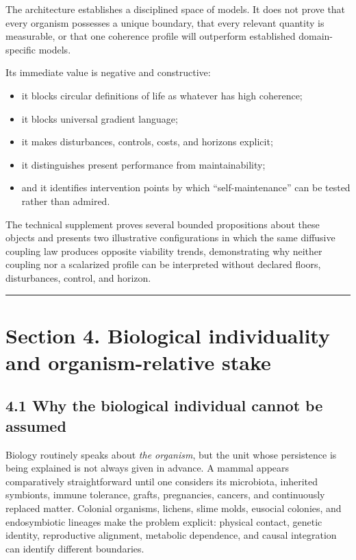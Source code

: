 \documentclass[
  11pt,
]{article}
\providecommand{\tightlist}{%
  \setlength{\itemsep}{0pt}\setlength{\parskip}{0pt}}
\begin{document}
The architecture establishes a disciplined space of models. It does not
prove that every organism possesses a unique boundary, that every
relevant quantity is measurable, or that one coherence profile will
outperform established domain-specific models.

Its immediate value is negative and constructive:

\begin{itemize}
\tightlist
\item
  it blocks circular definitions of life as whatever has high coherence;
\item
  it blocks universal gradient language;
\item
  it makes disturbances, controls, costs, and horizons explicit;
\item
  it distinguishes present performance from maintainability;
\item
  and it identifies intervention points by which ``self-maintenance''
  can be tested rather than admired.
\end{itemize}

The technical supplement proves several bounded propositions about these
objects and presents two illustrative configurations in which the same
diffusive coupling law produces opposite viability trends, demonstrating
why neither coupling nor a scalarized profile can be interpreted without
declared floors, disturbances, control, and horizon.

\begin{center}\rule{0.5\linewidth}{0.5pt}\end{center}

\section{Section 4. Biological individuality and organism-relative
stake}\label{section-4.-biological-individuality-and-organism-relative-stake}

\subsection{4.1 Why the biological individual cannot be
assumed}\label{why-the-biological-individual-cannot-be-assumed}

Biology routinely speaks about \emph{the organism}, but the unit whose
persistence is being explained is not always given in advance. A mammal
appears comparatively straightforward until one considers its
microbiota, inherited symbionts, immune tolerance, grafts, pregnancies,
cancers, and continuously replaced matter. Colonial organisms, lichens,
slime molds, eusocial colonies, and endosymbiotic lineages make the
problem explicit: physical contact, genetic identity, reproductive
alignment, metabolic dependence, and causal integration can identify
different boundaries.
\end{document}
